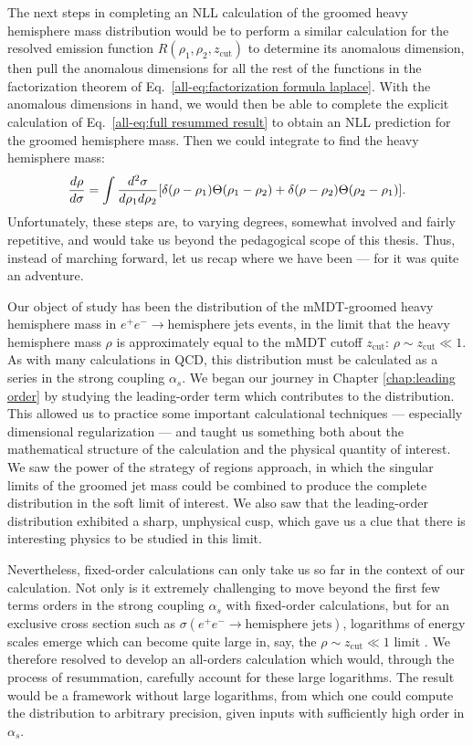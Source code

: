 \documentclass[../thesis.tex]{subfiles}
\providecommand{\zcut}{z_\mathrm{{cut}}}
\begin{document}
	The next steps in completing an NLL calculation of the groomed heavy hemisphere mass distribution would be to perform a similar calculation for the resolved emission function $R(\rho_1, \rho_2, \zcut)$ to determine its anomalous dimension, then pull the anomalous dimensions for all the rest of the functions in the factorization theorem of Eq.~\ref{all-eq:factorization formula laplace}. With the anomalous dimensions in hand, we would then be able to complete the explicit calculation of Eq.~\ref{all-eq:full resummed result} to obtain an NLL prediction for the groomed hemisphere mass. Then we could integrate to find the heavy hemisphere mass:
	\begin{equation}
		\frac{d\rho}{d\sigma} = \int \frac{d^2\sigma}{d\rho_1 d\rho_2}\qty[\delta(\rho - \rho_1)\Theta(\rho_1 - \rho_2) + \delta(\rho - \rho_2)\Theta(\rho_2 - \rho_1)].
	\end{equation}
	Unfortunately, these steps are, to varying degrees, somewhat involved and fairly repetitive, and would take us beyond the pedagogical scope of this thesis. Thus, instead of marching forward, let us recap where we have been --- for it was quite an adventure.

	Our object of study has been the distribution of the mMDT-groomed heavy hemisphere mass in $e^+ e^- \to \text{hemisphere jets}$ events, in the limit that the heavy hemisphere mass $\rho$ is approximately equal to the mMDT cutoff $\zcut$: $\rho \sim \zcut \ll 1$. As with many calculations in QCD, this distribution must be calculated as a series in the strong coupling $\alpha_s$. We began our journey in Chapter \ref{chap:leading order} by studying the leading-order term which contributes to the distribution. This allowed us to practice some important calculational techniques --- especially dimensional regularization --- and taught us something both about the mathematical structure of the calculation and the physical quantity of interest. We saw the power of the strategy of regions approach, in which the singular limits of the groomed jet mass could be combined to produce the complete distribution in the soft limit of interest. We also saw that the leading-order distribution exhibited a sharp, unphysical cusp, which gave us a clue that there is interesting physics to be studied in this limit.

	Nevertheless, fixed-order calculations can only take us so far in the context of our calculation. Not only is it extremely challenging to move beyond the first few terms orders in the strong coupling $\alpha_s$ with fixed-order calculations, but for an exclusive cross section such as $\sigma(e^+ e^- \to \text{hemisphere jets})$, logarithms of energy scales emerge which can become quite large in, say, the $\rho \sim \zcut \ll 1$ limit \cite{larkoski_elementary_2019-1}. We therefore resolved to develop an all-orders calculation which would, through the process of resummation, carefully account for these large logarithms. The result would be a framework without large logarithms, from which one could compute the distribution to arbitrary precision, given inputs with sufficiently high order in $\alpha_s$.
\end{document}
